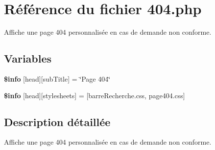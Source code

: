 \hypertarget{404_8php}{}\section{Référence du fichier 404.php}
\label{404_8php}


Affiche une page 404 personnalisée en cas de demande non conforme.  


\subsection*{Variables}
\begin{DoxyCompactItemize}
\item 
\mbox{\label{404_8php_a024f87f9bf4f3b33710e2e7ff8f60823}} 
{\bfseries \$info} \mbox{[}\textquotesingle{}head\textquotesingle{}\mbox{]}\mbox{[}\textquotesingle{}sub\+Title\textquotesingle{}\mbox{]} = \char`\"{}Page 404\char`\"{}
\item 
\mbox{\label{404_8php_af6044c8bf78ebc8c58057e14d7738bbd}} 
{\bfseries \$info} \mbox{[}\textquotesingle{}head\textquotesingle{}\mbox{]}\mbox{[}\textquotesingle{}stylesheets\textquotesingle{}\mbox{]} = \mbox{[}\textquotesingle{}barre\+Recherche.\+css\textquotesingle{}, \textquotesingle{}page404.\+css\textquotesingle{}\mbox{]}
\end{DoxyCompactItemize}


\subsection{Description détaillée}
Affiche une page 404 personnalisée en cas de demande non conforme. 

